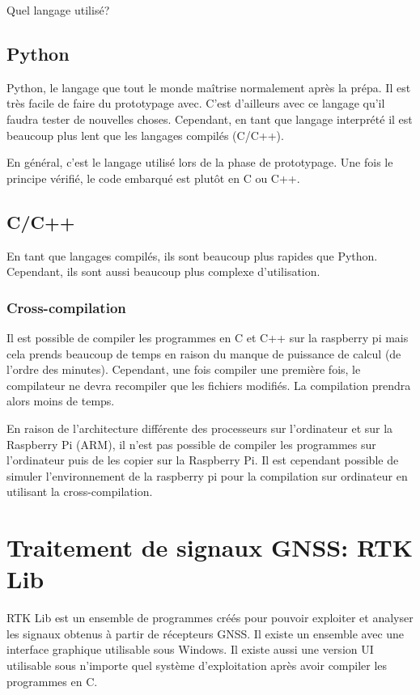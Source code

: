 \documentclass[a4paper, 11pt]{report}
\begin{document}
Quel langage utilisé?

\section{Python}
Python, le langage que tout le monde maîtrise normalement après la prépa. Il est très facile de faire du prototypage avec. C'est d'ailleurs avec ce langage qu'il faudra tester de nouvelles choses. Cependant, en tant que langage interprété il est beaucoup plus lent que les langages compilés (C/C++).

En général, c'est le langage utilisé lors de la phase de prototypage. Une fois le principe vérifié, le code embarqué est plutôt en C ou C++.

\section{C/C++}
En tant que langages compilés, ils sont beaucoup plus rapides que Python. Cependant, ils sont aussi beaucoup plus complexe d'utilisation.

\subsection{Cross-compilation}
Il est possible de compiler les programmes en C et C++ sur la raspberry pi mais cela prends beaucoup de temps en raison du manque de puissance de calcul (de l'ordre des minutes). Cependant, une fois compiler une première fois, le compilateur ne devra recompiler que les fichiers modifiés. La compilation prendra alors moins de temps. 

En raison de l'architecture différente des processeurs sur l'ordinateur et sur la Raspberry Pi (ARM), il n'est pas possible de compiler les programmes sur l'ordinateur puis de les copier sur la Raspberry Pi. Il est cependant possible de simuler l'environnement de la raspberry pi pour la compilation sur ordinateur en utilisant la cross-compilation.

\chapter{Traitement de signaux GNSS: RTK Lib}

RTK Lib est un ensemble de programmes créés pour pouvoir exploiter et analyser les signaux obtenus à partir de récepteurs GNSS. Il existe un ensemble avec une interface graphique utilisable sous Windows. Il existe aussi une version UI utilisable sous n'importe quel système d'exploitation après avoir compiler les programmes en C.
\end{document}
